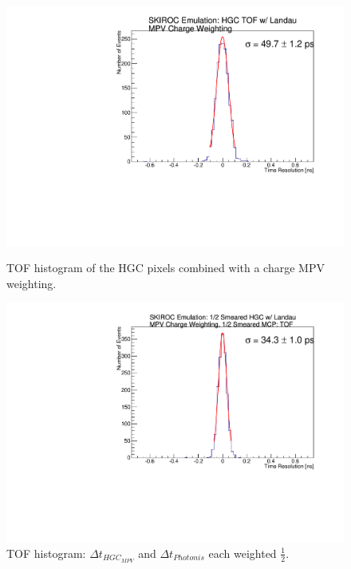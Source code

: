 \documentclass[12pt]{article}
\begin{document}
\begin{figure}[h]
\centering
\begin{minipage}[t]{.49\textwidth}
	\includegraphics[width=\textwidth]{SKIROC/deltaTPicoSilLandauChargeSmear50.pdf}
	\caption{TOF histogram of the HGC pixels combined with a charge MPV weighting.}
	\label{fig:50ps_HGCMPV}
\end{minipage}\hfill
\begin{minipage}[t]{.49\textwidth}
	\includegraphics[width=\textwidth]{SKIROC/deltaT_PicoSilLandauCharge_MCP_Equal_BothSmear50.pdf}
	\caption{TOF histogram: $\Delta t_{HGC_{MPV}}$ and $\Delta t_{Photonis}$ each weighted $\frac{1}{2}$.}
	\label{fig:50ps_HGCMPV_MCP}
\end{minipage}
\end{figure}
\end{document}

